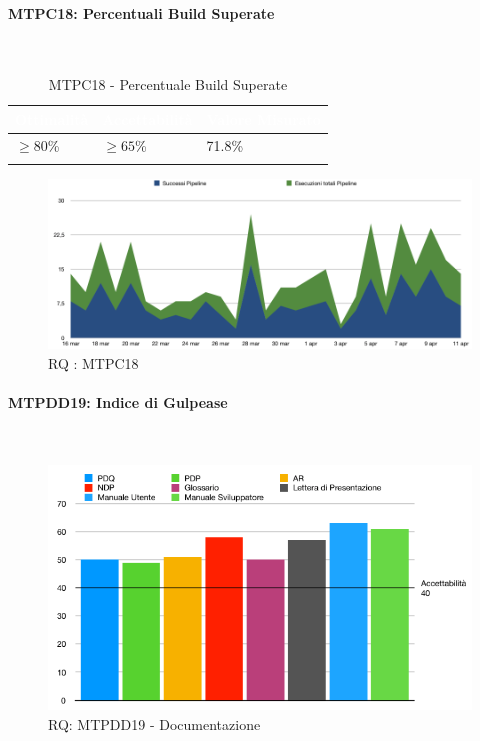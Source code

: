 \pagebreak

\paragraph{MTPC18: Percentuali Build Superate}\-\\

\begin{longtable}{|C{.15\textwidth}|C{.24\textwidth}|C{.24\textwidth}|}
	\hline
	\textbf{\textcolor{white}{Ottimalità}} & \textbf{\textcolor{white}{Accettabilità}} & \textbf{\textcolor{white}{Valore Misurato}} \\
	\hline \hline
	\endfirsthead
	$\geq 80$\% & $\geq 65$\% & 71.8\% \\
	\hline
	\caption{MTPC18 - Percentuale Build Superate}
	\label{mtpc17}
\end{longtable}
\begin{figure}[H]
	\begin{center}
		\includegraphics[scale=0.5]{./images/grafici_RQ/pipeline.png} 
	\end{center}
	\caption{RQ : MTPC18}
\end{figure}

\pagebreak

\paragraph{MTPDD19: Indice di Gulpease}\-\\
\label{gulpiRQ}

\begin{figure}[H]
	\begin{center}
		\includegraphics[scale=0.6]{./images/grafici_RQ/gulpeaseDocumenti.png} 
	\end{center}
	\caption{RQ: MTPDD19 - Documentazione}
\end{figure}

